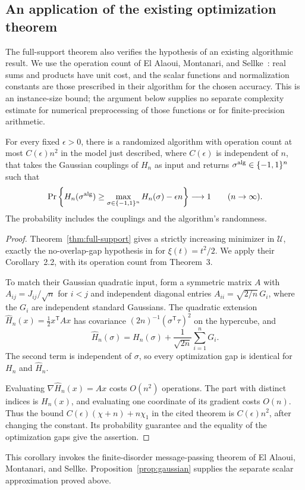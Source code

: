 \subsection{An application of the existing optimization theorem}
\label{sec:algorithm-application}

The full-support theorem also verifies the hypothesis of an existing
algorithmic result. We use the operation count of El Alaoui, Montanari,
and Sellke~\cite[Remark~2.1, Theorem~3, and Corollary~2.2 of the cited
preprint]{EAMS2021}: real sums and products have unit cost, and the scalar
functions and normalization constants are those prescribed in their
algorithm for the chosen accuracy. This is an instance-size bound;
the argument below supplies no separate complexity estimate for numerical
preprocessing of those functions or for finite-precision arithmetic.

\begin{corollary}
\label{cor:algorithm}
For every fixed $\epsilon>0$, there is a randomized algorithm with
operation count at most $C(\epsilon)n^2$ in the model just described,
where $C(\epsilon)$ is independent of $n$, that takes the Gaussian
couplings of $H_n$ as input and returns
$\sigma^{\rm alg}\in\{-1,1\}^n$ such that
\[
 \Pr\left\{
 H_n(\sigma^{\rm alg})\geq
 \max_{\sigma\in\{-1,1\}^n}H_n(\sigma)-\epsilon n
 \right\}\longrightarrow1
 \qquad(n\to\infty).
\]
The probability includes the couplings and the algorithm's randomness.
\end{corollary}

\begin{proof}
Theorem~\ref{thm:full-support} gives a strictly increasing minimizer
in $\mathcal U$, exactly the no-overlap-gap hypothesis in
\cite[Assumption~2]{EAMS2021} for $\xi(t)=t^2/2$.
We apply their Corollary~2.2, with its operation count from Theorem~3.

To match their Gaussian quadratic input, form a symmetric matrix $A$
with $A_{ij}=J_{ij}/\sqrt n$ for $i<j$ and independent diagonal entries
$A_{ii}=\sqrt{2/n}\,G_i$, where the $G_i$ are independent standard
Gaussians. The quadratic extension
$\widehat H_n(x)=\frac12x^{\mathsf T}Ax$ has covariance
$(2n)^{-1}(\sigma^{\mathsf T}\tau)^2$ on the hypercube, and
\[
 \widehat H_n(\sigma)
   =H_n(\sigma)+\frac{1}{\sqrt{2n}}\sum_{i=1}^nG_i.
\]
The second term is independent of $\sigma$, so every optimization gap
is identical for $H_n$ and $\widehat H_n$.

Evaluating $\nabla\widehat H_n(x)=Ax$ costs $O(n^2)$ operations.
The part with distinct indices is $H_n(x)$, and evaluating one coordinate
of its gradient costs $O(n)$. Thus the bound
$C(\epsilon)(\chi+n)+n\chi_1$ in the cited theorem is
$C(\epsilon)n^2$, after changing the constant. Its probability guarantee
and the equality of the optimization gaps give the assertion.
\end{proof}

This corollary invokes the finite-disorder message-passing theorem of
El Alaoui, Montanari, and Sellke. Proposition~\ref{prop:gaussian} supplies
the separate scalar approximation proved above.
